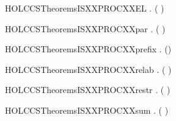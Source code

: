 \newcommand{\HOLCCSTheoremsISXXLABELXXdef}{\UseVerbatim{HOLCCSTheoremsISXXLABELXXdef}}
\begin{SaveVerbatim}{HOLCCSTheoremsISXXPROCXXEL}
\HOLTokenTurnstile{} \HOLSymConst{\HOLTokenForall{}} .   \HOLSymConst{\HOLTokenConj{}}  \HOLSymConst{\HOLTokenLt{}}   \HOLSymConst{\HOLTokenImp{}}  (  )
\end{SaveVerbatim}
\newcommand{\HOLCCSTheoremsISXXPROCXXEL}{\UseVerbatim{HOLCCSTheoremsISXXPROCXXEL}}
\begin{SaveVerbatim}{HOLCCSTheoremsISXXPROCXXpar}
\HOLTokenTurnstile{} \HOLSymConst{\HOLTokenForall{}} .  ( \HOLSymConst{\ensuremath{\parallel}} ) \HOLSymConst{\HOLTokenEquiv{}}   \HOLSymConst{\HOLTokenConj{}}  
\end{SaveVerbatim}
\newcommand{\HOLCCSTheoremsISXXPROCXXpar}{\UseVerbatim{HOLCCSTheoremsISXXPROCXXpar}}
\begin{SaveVerbatim}{HOLCCSTheoremsISXXPROCXXprefix}
\HOLTokenTurnstile{} \HOLSymConst{\HOLTokenForall{}} .  () \HOLSymConst{\HOLTokenEquiv{}}  
\end{SaveVerbatim}
\newcommand{\HOLCCSTheoremsISXXPROCXXprefix}{\UseVerbatim{HOLCCSTheoremsISXXPROCXXprefix}}
\begin{SaveVerbatim}{HOLCCSTheoremsISXXPROCXXrelab}
\HOLTokenTurnstile{} \HOLSymConst{\HOLTokenForall{}} .  (  ) \HOLSymConst{\HOLTokenEquiv{}}  
\end{SaveVerbatim}
\newcommand{\HOLCCSTheoremsISXXPROCXXrelab}{\UseVerbatim{HOLCCSTheoremsISXXPROCXXrelab}}
\begin{SaveVerbatim}{HOLCCSTheoremsISXXPROCXXrestr}
\HOLTokenTurnstile{} \HOLSymConst{\HOLTokenForall{}} .  (\HOLConst{\ensuremath{\nu}}  ) \HOLSymConst{\HOLTokenEquiv{}}  
\end{SaveVerbatim}
\newcommand{\HOLCCSTheoremsISXXPROCXXrestr}{\UseVerbatim{HOLCCSTheoremsISXXPROCXXrestr}}
\begin{SaveVerbatim}{HOLCCSTheoremsISXXPROCXXsum}
\HOLTokenTurnstile{} \HOLSymConst{\HOLTokenForall{}} .  ( \HOLSymConst{\ensuremath{+}} ) \HOLSymConst{\HOLTokenEquiv{}}   \HOLSymConst{\HOLTokenConj{}}  
\end{SaveVerbatim}
